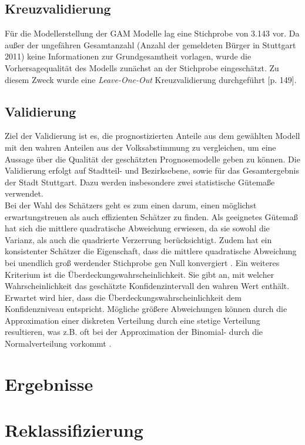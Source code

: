 \documentclass{Vorlage}
\begin{document}
\subsection{Kreuzvalidierung}
Für die Modellerstellung der GAM Modelle lag eine Stichprobe von 3.143 vor. Da außer der ungefähren Gesamtanzahl 
(Anzahl der gemeldeten Bürger in Stuttgart 2011) keine Informationen zur Grundgesamtheit vorlagen, wurde die 
Vorhersagequalität des Modells zunächst an der Stichprobe eingeschätzt. Zu diesem Zweck wurde eine 
\textit{Leave-One-Out} Kreuzvalidierung durchgeführt \cite{fahrmeir2013regression}[p. 149].

\subsection{Validierung}

Ziel der Validierung ist es, die prognostizierten Anteile aus dem gewählten Modell mit den wahren Anteilen aus der Volksabstimmung \cite{Amt} zu vergleichen, um eine Aussage über die Qualität der geschätzten Prognosemodelle geben zu können. Die Validierung erfolgt auf Stadtteil- und Bezirksebene, sowie für das Gesamtergebnis der Stadt Stuttgart. Dazu werden insbesondere zwei statistische Gütemaße verwendet.\\
Bei der Wahl des Schätzers geht es zum einen darum, einen möglichst erwartungstreuen als auch effizienten Schätzer zu finden. Als geeignetes Gütemaß hat sich die mittlere quadratische Abweichung erwiesen, da sie sowohl die Varianz, als auch die quadrierte Verzerrung berücksichtigt. Zudem hat ein konsistenter Schätzer die Eigenschaft, dass die mittlere quadratische Abweichung bei unendlich groß werdender Stichprobe gen Null konvergiert \cite[p. 201]{HOG}. Ein weiteres Kriterium ist die Überdeckungswahrscheinlichkeit. Sie gibt an, mit welcher Wahrscheinlichkeit das geschätzte Konfidenzintervall den wahren Wert enthält. Erwartet wird hier, dass die Überdeckungswahrscheinlichkeit dem Konfidenzniveau entspricht. Mögliche größere Abweichungen können durch die Approximation einer diskreten Verteilung durch eine stetige Verteilung resultieren, was z.B. oft bei der Approximation der Binomial- durch die Normalverteilung vorkommt \cite[p. 102]{Int}.  

\section{Ergebnisse}

\section{Reklassifizierung}
\end{document}
